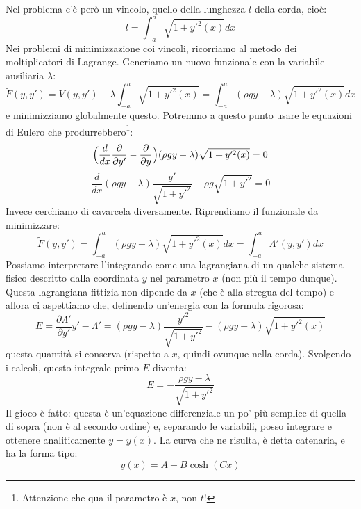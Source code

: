 \documentclass[a4paper,openany]{article}
\begin{document}
Nel problema c'è però un vincolo, quello della lunghezza $l$ della corda, cioè:
\begin{equation}\label{key}
	l = \int_{-a}^{a}\sqrt{1+y'^2(x)}dx
\end{equation}
Nei problemi di minimizzazione coi vincoli, ricorriamo al metodo dei moltiplicatori di Lagrange. Generiamo un nuovo funzionale con la variabile ausiliaria $\lambda$:
\begin{equation}\label{key}
	\tilde{F}(y,y') = V(y,y')-\lambda\int_{-a}^{a}\sqrt{1+y'^2(x)} =\int_{-a}^{a}(\rho g y-\lambda)\sqrt{1+y'^2(x)}  dx
\end{equation}
e minimizziamo globalmente questo. Potremmo a questo punto usare le equazioni di Eulero che produrrebbero\footnote{Attenzione che qua il parametro è $x$, non $t$!}:
\begin{equation}\label{key}
	\Bigl(\dfrac{d}{dx}\dfrac{\partial}{\partial y'}-\dfrac{\partial}{\partial y}\Bigl)(\rho g y-\lambda)\sqrt{1+y'^2(x)} = 0
\end{equation}
\begin{equation}\label{key}
	\dfrac{d}{dx}(\rho g y -\lambda)\dfrac{y'}{\sqrt{1+y'^2}}-\rho g \sqrt{1+y'^2} =0
\end{equation}
Invece cerchiamo di cavarcela diversamente. Riprendiamo il funzionale da minimizzare:
\begin{equation}\label{key}
	\tilde{F}(y,y') =\int_{-a}^{a}(\rho g y-\lambda)\sqrt{1+y'^2(x)}  dx =\int_{-a}^{a} \Lambda'(y,y')dx
\end{equation}
Possiamo interpretare l'integrando come una lagrangiana di un qualche sistema fisico descritto dalla coordinata $y$ nel parametro $x$ (non più il tempo dunque). Questa lagrangiana fittizia non dipende da $x$ (che è alla stregua del tempo) e allora ci aspettiamo che, definendo un'energia con la formula rigorosa:
\begin{equation}\label{key}
	E = \dfrac{\partial \Lambda'}{\partial y'}y'-\Lambda' = (\rho g y -\lambda)\dfrac{y'^2}{\sqrt{1+y'^2}} - (\rho g y-\lambda)\sqrt{1+y'^2(x)} 
\end{equation}
questa quantità si conserva (rispetto a $x$, quindi ovunque nella corda). Svolgendo i calcoli, questo integrale primo $E$ diventa:
\begin{equation}\label{key}
	E = - \dfrac{\rho g y - \lambda}{\sqrt{1+y'^2}}
\end{equation}
Il gioco è fatto: questa è un'equazione differenziale un po' più semplice di quella di sopra (non è al secondo ordine) e, separando le variabili, posso integrare e ottenere analiticamente $y=y(x)$. La curva che ne risulta, è detta catenaria, e ha la forma tipo:
\begin{equation}\label{key}
	y(x) = A - B\cosh(Cx)
\end{equation}
\end{document}
